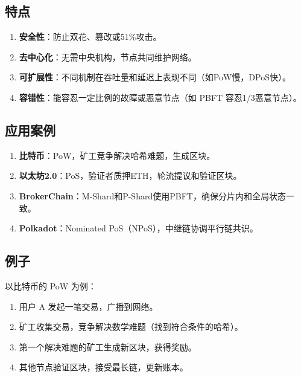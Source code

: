 \documentclass[12pt]{ctexart}
\begin{document}
\subsection{特点}
\begin{enumerate}
    \item \textbf{安全性}：防止双花、篡改或51\%攻击。
    \item \textbf{去中心化}：无需中央机构，节点共同维护网络。
    \item \textbf{可扩展性}：不同机制在吞吐量和延迟上表现不同（如PoW慢，DPoS快）。
    \item \textbf{容错性}：能容忍一定比例的故障或恶意节点（如 PBFT 容忍1/3恶意节点）。
\end{enumerate}

\subsection{应用案例}
\begin{enumerate}
    \item \textbf{比特币}：PoW，矿工竞争解决哈希难题，生成区块。
    \item \textbf{以太坊2.0}：PoS，验证者质押ETH，轮流提议和验证区块。
    \item \textbf{BrokerChain}：M-Shard和P-Shard使用PBFT，确保分片内和全局状态一致。
    \item \textbf{Polkadot}：Nominated PoS（NPoS），中继链协调平行链共识。
\end{enumerate}

\subsection{例子}
以比特币的 PoW 为例：
\begin{enumerate}
    \item 用户 A 发起一笔交易，广播到网络。
    \item 矿工收集交易，竞争解决数学难题（找到符合条件的哈希）。
    \item 第一个解决难题的矿工生成新区块，获得奖励。
    \item 其他节点验证区块，接受最长链，更新账本。
\end{enumerate}
\end{document}

